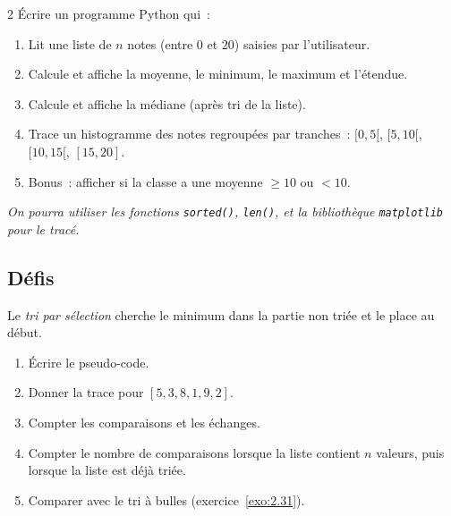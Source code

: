 \begin{probleme}{2}
\'Ecrire un programme Python qui~:
\begin{enumerate}
  \item Lit une liste de $n$ notes (entre $0$ et $20$) saisies par l'utilisateur.
  \item Calcule et affiche la moyenne, le minimum, le maximum et l'\'etendue.
  \item Calcule et affiche la m\'ediane (apr\`es tri de la liste).
  \item Trace un histogramme des notes regroup\'ees par tranches~:
        $[0,5[$, $[5,10[$, $[10,15[$, $[15,20]$.
  \item Bonus~: afficher si la classe a une moyenne $\geq 10$ ou $< 10$.
\end{enumerate}
\emph{On pourra utiliser les fonctions \texttt{sorted()}, \texttt{len()},
et la biblioth\`eque \texttt{matplotlib} pour le trac\'e.}
\end{probleme}

\subsection*{D\'efis}

\begin{challenge}
Le \emph{tri par s\'election} cherche le minimum dans la partie non tri\'ee
et le place au d\'ebut.
\begin{enumerate}
  \item \'Ecrire le pseudo-code.
  \item Donner la trace pour $[5, 3, 8, 1, 9, 2]$.
  \item Compter les comparaisons et les \'echanges.
  \item Compter le nombre de comparaisons lorsque la liste contient $n$
        valeurs, puis lorsque la liste est déjà triée.
  \item Comparer avec le tri \`a bulles (exercice~\ref{exo:2.31}).
\end{enumerate}
\end{challenge}

